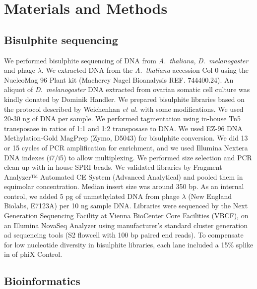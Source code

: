 \documentclass[10pt,letterpaper]{article}
\begin{document}
\section*{Materials and Methods}

\subsection*{Bisulphite sequencing}

We performed bisulphite sequencing of DNA from \textit{A.~thaliana}, \emph{D.~melanogaster} and phage $\lambda$.
We extracted DNA from the \textit{A.~thaliana} accession Col-0 using the NucleoMag 96 Plant kit (Macherey Nagel Bioanalysis REF. 744400.24).
An aliquot of \textit{D.~melanogaster} DNA extracted from ovarian somatic cell culture \cite{niki2006establishment, saito2009regulatory} was kindly donated by Dominik Handler.
We prepared bisulphite libraries based on the protocol described by Weichenhan \textit{et al.} \cite{weichenhan2019generation} with some modifications.
We used 20-30 ng of DNA per sample.
We performed tagmentation using in-house Tn5 transposase in ratios of 1:1 and 1:2 transposase to DNA.
We used EZ-96 DNA Methylation-Gold MagPrep (Zymo, D5043) for bisulphite conversion.
We did 13 or 15 cycles of PCR amplification for enrichment, and we used Illumina Nextera DNA indexes (i7/i5) to allow multiplexing.
We performed size selection and PCR clean-up with in-house SPRI beads.
We validated libraries by Fragment Analyzer™ Automated CE System (Advanced Analytical) and pooled them in equimolar concentration.
Median insert size was around 350 bp.
As an internal control, we added 5 pg of unmethylated DNA from phage $\lambda$ (New England Biolabs, E7123A) per 10 ng sample DNA. 
Libraries were sequenced by the Next Generation Sequencing Facility at Vienna BioCenter Core Facilities (VBCF), on an Illumina NovaSeq Analyzer using manufacturer’s standard cluster generation ad sequencing tools (S2 flowcell with 100 bp paired end reads).
To compensate for low nucleotide diversity in bisulphite libraries, each lane included a 15\% splike in of phiX Control.

\subsection*{Bioinformatics}
\end{document}
